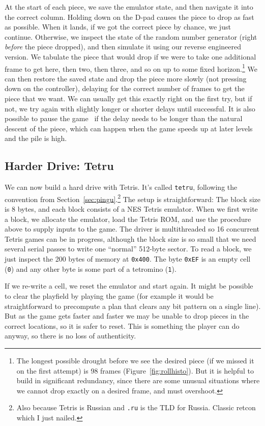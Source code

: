 \documentclass[twocolumn]{article}
\begin{document}
At the start of each piece, we save the emulator state, and then
navigate it into the correct column. Holding down on the D-pad causes
the piece to drop as fast as possible. When it lands, if we got the
correct piece by chance, we just continue. Otherwise, we inspect the
state of the random number generator (right {\em before} the piece
dropped), and then simulate it using our reverse engineered version.
We tabulate the piece that would drop if we were to take one
additional frame to get here, then two, then three, and so on up to
some fixed horizon.\footnote{The longest possible drought before we
  see the desired piece (if we missed it on the first attempt) is 98
  frames (Figure~\ref{fig:rollhisto}). But it is helpful to build in
  significant redundancy, since there are some unusual situations
  where we cannot drop exactly on a desired frame, and must
  overshoot.} We can then restore the saved state and drop the piece
more slowly (not pressing down on the controller), delaying for the
correct number of frames to get the piece that we want. We can usually
get this exactly right on the first try, but if not, we try again with
slightly longer or shorter delays until successful. It is also
possible to pause the game~\cite{murphy2013first} if the delay needs
to be longer than the natural descent of the piece, which can happen
when the game speeds up at later levels and the pile is high.

\subsection{Harder Drive: Tetru}

We can now build a hard drive with Tetris. It's called {\tt tetru},
following the convention from Section~\ref{sec:pingu}.\footnote{Also
  because Tetris is Russian and {\tt .ru} is the TLD for Russia.
  Classic retcon which I just nailed.} The setup is straightforward:
The block size is 8 bytes, and each block consists of a NES Tetris
emulator. When we first write a block, we allocate the emulator, load
the Tetris ROM, and use the procedure above to supply inputs to the
game. The driver is multithreaded so 16 concurrent Tetris games can be
in progress, although the block size is so small that we need several
serial passes to write one ``normal'' 512-byte sector. To read a
block, we just inspect the 200 bytes of memory at {\tt 0x400}.
The byte {\tt 0xEF} is an empty cell ({\tt 0}) and any other byte is some
part of a tetromino ({\tt 1}).

If we re-write a cell, we reset the emulator and start again. It might
be possible to clear the playfield by playing the game (for example it
would be straightforward to precompute a plan that clears any bit
pattern on a single line). But as the game gets faster and faster we
may be unable to drop pieces in the correct locations, so it is safer
to reset. This is something the player can do anyway, so there is no
loss of authenticity.
\end{document}
